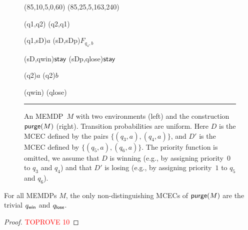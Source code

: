 \documentclass[a4paper,USenglish,cleveref, autoref, thm-restate]{lipics-v2021}
\def\loseabsorb{q_{\sf lose}}
\def\winabsorb{q_{\sf win}}
\newcommand\purge[1]{\textrm{\sf purge}(#1)}
\def\actionstay{\textrm{\sf stay}}
\begin{document}
\begin{figure}[!t]
\begin{gpicture}
\drawarc[linegray=0](85,10,5,0,60)       \drawarc[linegray=0](85,25,5,163,240)    






\drawedge[ELside=l,ELpos=50, ELdist=1, curvedepth=-3](q1,q2){}
\drawedge[ELside=l,ELpos=50, ELdist=1, curvedepth=-3](q2,q1){}



\drawedge[ELside=r, ELpos=30, ELdist=1](q1,sD){$a$}
\drawedge[ELside=r, ELpos=40, ELdist=1](sD,sDp){$F_{q_4,b}$}

\drawedge[ELside=r, ELpos=35, ELdist=1](sD,qwin){$\actionstay$}
\drawedge[ELside=r, ELpos=35, ELdist=1](sDp,qlose){$\actionstay$}




\drawloop[ELside=l, ELpos=25, ELdist=.5,loopCW=y, loopangle=135](q2){$a$}
\drawloop[ELside=r, ELpos=25, ELdist=.5,loopCW=n, loopangle=45](q2){$b$}




\drawloop[ELside=l,loopCW=y, loopangle=0](qwin){}
\drawloop[ELside=l,loopCW=y, loopangle=0](qlose){}











\end{gpicture}

 \hrule
   \caption{
    An MEMDP~$M$ with two environments (left) and the construction $\purge{M}$ (right).
    Transition probabilities are uniform.
    Here $D$ is the MCEC defined by the pairs $\{(q_3,a), (q_4,a)\}$, and $D'$ is the MCEC defined by
    $\{(q_5,a), (q_6,a)\}$. The priority function is omitted, we assume that $D$ is winning (e.g., by assigning priority~$0$ to $q_3$ and $q_4$) and that $D'$ is losing (e.g., by assigning priority~$1$ to $q_5$ and $q_6$).  \label{fig:removing-nondist-cec}
  }
\end{figure}

\begin{lemma}
  \label{lemma:removing-nondist-cecs-1}
  For all MEMDPs $M$, the only non-distinguishing MCECs of $\purge{M}$ are the trivial $\winabsorb$ and $\loseabsorb$.
\end{lemma}

\begin{proof}\textcolor{red}{TOPROVE 10}\end{proof}
\end{document}
